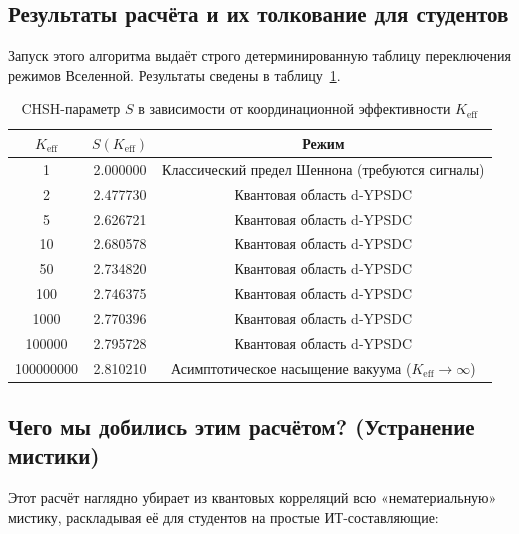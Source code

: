 \documentclass[12pt,a4paper]{article}
\begin{document}
	\subsection{Результаты расчёта и их толкование для студентов}
	
	Запуск этого алгоритма выдаёт строго детерминированную таблицу переключения режимов Вселенной. Результаты сведены в таблицу~\ref{tab:bell_yuct}.
	
	\begin{table}[htbp]
		\centering
		\small
		\setlength{\tabcolsep}{4pt}
		\caption{CHSH-параметр \(S\) в зависимости от координационной эффективности \(K_{\mathrm{eff}}\)}
		\label{tab:bell_yuct}
		\begin{tabular}{ccc}
			\toprule
			\(K_{\mathrm{eff}}\) & \(S(K_{\mathrm{eff}})\) & Режим \\
			\midrule
			1            & 2.000000 & Классический предел Шеннона (требуются сигналы) \\
			2            & 2.477730 & Квантовая область d‑YPSDC \\
			5            & 2.626721 & Квантовая область d‑YPSDC \\
			10           & 2.680578 & Квантовая область d‑YPSDC \\
			50           & 2.734820 & Квантовая область d‑YPSDC \\
			100          & 2.746375 & Квантовая область d‑YPSDC \\
			1000         & 2.770396 & Квантовая область d‑YPSDC \\
			100000       & 2.795728 & Квантовая область d‑YPSDC \\
			100000000    & 2.810210 & Асимптотическое насыщение вакуума (\(K_{\mathrm{eff}} \to \infty\)) \\
			\bottomrule
		\end{tabular}
	\end{table}
	
	\subsection{Чего мы добились этим расчётом? (Устранение мистики)}
	
	Этот расчёт наглядно убирает из квантовых корреляций всю «нематериальную» мистику, раскладывая её для студентов на простые ИТ‑составляющие:
	
\end{document}

